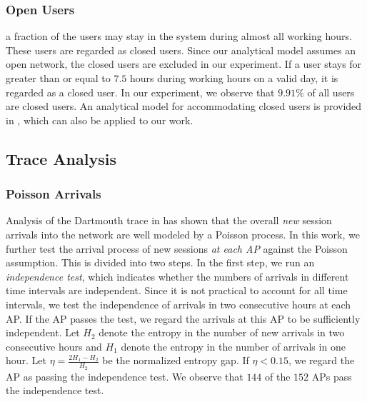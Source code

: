 \subsubsection{Open Users}
a fraction of the users may stay in the system during almost all working hours. These users are regarded as closed users.  Since our analytical model assumes an open network, the closed users are excluded in our experiment.  If a user stays for greater than or equal to $7.5$ hours during working hours on a valid day, it is regarded as a closed user. In our experiment, we observe that $9.91\%$ of all users are closed users.  An analytical model for accommodating closed users is provided in \cite{Mobility-Core1}, which can also be applied to our work.



\subsection{Trace Analysis}

\subsubsection{Poisson Arrivals} \label{section_arrival}

Analysis of the Dartmouth trace in \cite{Mobility-Core1} has shown that the overall \emph{new} session arrivals into the network are well modeled by a Poisson process.  In this work, we further test the arrival process of new sessions \emph{at each AP} against the Poisson assumption.  This is divided into two steps. In the first step, we run an \emph{independence test}, which indicates whether the numbers of arrivals in different time intervals are independent. Since it is not practical to account for all time intervals, we test the independence of arrivals in two consecutive hours at each AP. If the AP passes the test, we regard the arrivals at this AP to be sufficiently independent. Let $H_2$ denote the entropy in the number of new arrivals in two consecutive hours and $H_1$ denote the entropy in the number of arrivals in one hour. Let $\eta=\frac{2H_1-H_2}{H_2}$ be the normalized entropy gap. If $\eta<0.15$, we regard the AP as passing the independence test.  We observe that $144$ of the $152$ APs pass the independence test.

